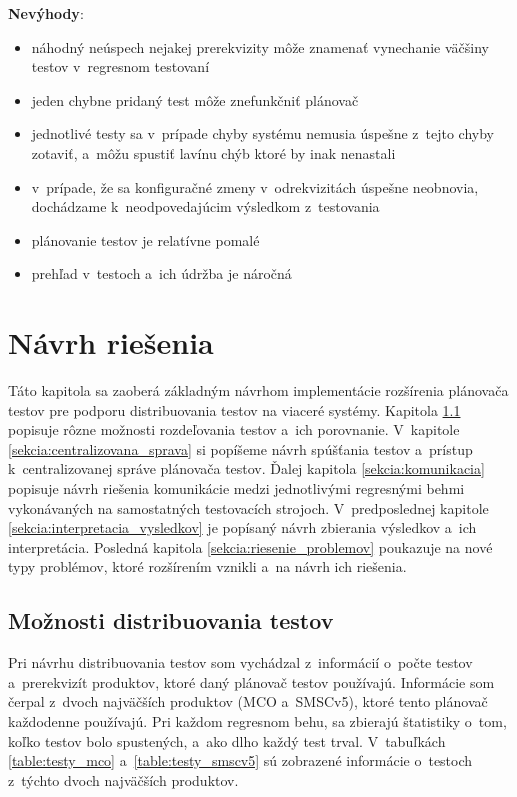 \noindent \textbf{Nevýhody}:
\begin{itemize}
\item náhodný neúspech nejakej prerekvizity môže znamenať vynechanie väčšiny testov v~regresnom testovaní
\item jeden chybne pridaný test môže znefunkčniť plánovač
\item jednotlivé testy sa v~prípade chyby systému nemusia úspešne z~tejto chyby zotaviť, a~môžu spustiť lavínu chýb ktoré by inak nenastali 
\item v~prípade, že sa konfiguračné zmeny v~odrekvizitách úspešne neobnovia, dochádzame k~neodpovedajúcim výsledkom z~testovania
\item plánovanie testov je relatívne pomalé
\item prehľad v~testoch a~ich údržba je náročná
\end{itemize}


%
%
\chapter{Návrh riešenia}
Táto kapitola sa zaoberá základným návrhom implementácie rozšírenia plánovača testov pre podporu 
distribuovania testov na viaceré systémy. Kapitola \ref{sekcia:moznosti_distribuovania} popisuje rôzne
možnosti rozdeľovania testov a~ich porovnanie. V~kapitole \ref{sekcia:centralizovana_sprava}
si popíšeme návrh spúšťania testov a~prístup k~centralizovanej správe plánovača testov.
Ďalej kapitola \ref{sekcia:komunikacia} popisuje návrh riešenia komunikácie medzi jednotlivými
regresnými behmi vykonávaných na samostatných testovacích strojoch. V~predposlednej kapitole 
\ref{sekcia:interpretacia_vysledkov} je popísaný návrh zbierania výsledkov a~ich interpretácia.
Posledná kapitola \ref{sekcia:riesenie_problemov} poukazuje na nové typy problémov,
ktoré rozšírením vznikli a~na návrh ich riešenia.



\section{Možnosti distribuovania testov}
\label{sekcia:moznosti_distribuovania}
Pri návrhu distribuovania testov som vychádzal z~informácií o~počte testov a~prerekvizít produktov,
ktoré daný plánovač testov používajú. Informácie som čerpal z~dvoch najväčších produktov (MCO a~SMSCv5), 
ktoré tento plánovač každodenne používajú. Pri každom regresnom behu, sa zbierajú štatistiky o~tom,
koľko testov bolo spustených, a~ako dlho každý test trval. 
V~tabuľkách \ref{table:testy_mco} a~\ref{table:testy_smscv5} sú zobrazené informácie o~testoch z~týchto dvoch najväčších produktov.

